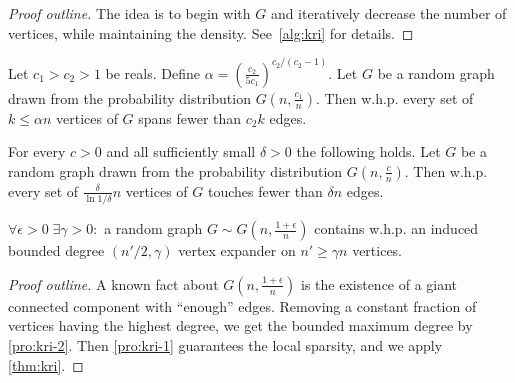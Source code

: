 \begin{proof}[Proof outline]
    The idea is to begin with $G$ and iteratively decrease
    the number of vertices, while maintaining the density.
    See~\autoref{alg:kri} for details.
\end{proof}

\begin{proposition}
    \label{pro:kri-1}
    Let $c_1>c_2>1$ be reals. Define $\alpha=\left(\frac{c_2}{5c_1}\right)^{c_2/(c_2-1)}$.
    Let $G$ be a random graph drawn from the probability distribution $G\left(n,\frac{c_1}{n}\right)$.
    Then w.h.p. every set of $k\leq\alpha n$ vertices of $G$ spans fewer than $c_2k$ edges.
\end{proposition}

\begin{proposition}
    \label{pro:kri-2}
    For every $c>0$ and all sufficiently small $\delta>0$ the following holds.
    Let $G$ be a random graph drawn from the probability distribution $G\left(n,\frac{c}{n}\right)$.
    Then w.h.p. every set of $\frac{\delta}{\ln 1/\delta}n$ vertices of $G$ touches fewer than $\delta n$ edges.
\end{proposition}

\begin{theorem}
    \label{thm:kri-gnp}
    $\forall\epsilon>0\;\exists\gamma>0:$ a random graph $G\sim G\left(n,\frac{1+\epsilon}{n}\right)$
    contains w.h.p. an induced bounded degree $(n'/2,\gamma)$ vertex expander
    on $n'\geq\gamma n$ vertices.
\end{theorem}

\begin{proof}[Proof outline]
    A known fact about $G\left(n,\frac{1+\epsilon}{n}\right)$ is the existence of a giant connected component with ``enough'' edges.
    Removing a constant fraction of vertices having the highest degree, we get the bounded maximum degree by \autoref{pro:kri-2}.
    Then \autoref{pro:kri-1} guarantees the local sparsity, and we apply \autoref{thm:kri}.
\end{proof}
